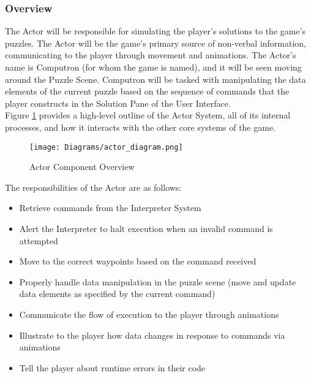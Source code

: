 \subsubsection{Overview}
The Actor will be responsible for simulating the player's solutions to the game's puzzles. 
The Actor will be the game's primary source of non-verbal information, communicating 
to the player through movement and animations. The Actor's name is Computron (for 
whom the game is named), and it will be seen moving around the Puzzle Scene. Computron 
will be tasked with manipulating the data elements of the current puzzle based on the sequence 
of commands that the player constructs in the Solution Pane of the User Interface. \\

Figure \ref{fig:actor_diagram} provides a high-level outline of the Actor System, all of its internal processes, and how it interacts with the other core systems of the game.\\

\begin{figure}[!htb]
  \caption{Actor Component Overview}
  \label{fig:actor_diagram}
  \centering
  \texttt{[image: Diagrams/actor\_diagram.png]}
\end{figure}
\newpage
The responsibilities of the Actor are as follows:

\begin{itemize}
	\item Retrieve commands from the Interpreter System
	\item Alert the Interpreter to halt execution when an invalid command is attempted
	\item Move to the correct waypoints based on the command received
	\item Properly handle data manipulation in the puzzle scene (move and update data elements
			as specified by the current command)
	\item Communicate the flow of execution to the player through animations
	\item Illustrate to the player how data changes in response to commands via animations
	\item Tell the player about runtime errors in their code
\end{itemize}

